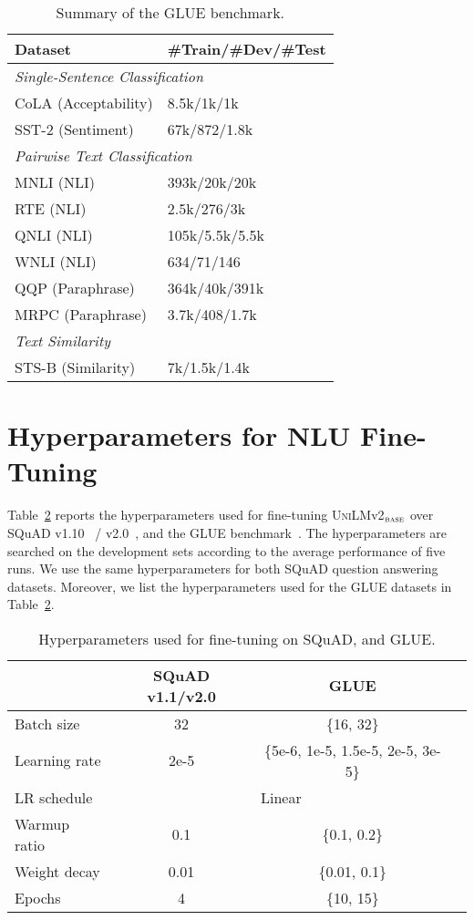 \documentclass{article}
\newcommand{\vtwobase}{\textsc{UniLM}v2$_{\textsc{base}}$}
\begin{document}
\begin{table}[h]
\centering
\begin{tabular}{l l}
\toprule 
\textbf{Dataset} & \textbf{\#Train/\#Dev/\#Test}   \\ \midrule
\multicolumn{2}{l}{\emph{Single-Sentence Classification}} \\
CoLA (Acceptability)&8.5k/1k/1k \\
SST-2 (Sentiment)&67k/872/1.8k \\ \midrule
\multicolumn{2}{l}{\emph{Pairwise Text Classification}} \\
MNLI (NLI)& 393k/20k/20k\\
RTE (NLI) &2.5k/276/3k \\ 
QNLI (NLI)& 105k/5.5k/5.5k\\
WNLI (NLI) &634/71/146\\ 
QQP (Paraphrase)&364k/40k/391k\\ 
MRPC (Paraphrase) &3.7k/408/1.7k\\ \midrule
\multicolumn{2}{l}{\emph{Text Similarity}} \\
STS-B (Similarity) &7k/1.5k/1.4k \\ \bottomrule
\end{tabular}
\caption{Summary of the GLUE benchmark.
}
\label{tbl:glue:datasets}
\end{table}


\section{Hyperparameters for NLU Fine-Tuning}

Table~\ref{tbl:nlu_finetune_hyperparams} reports the hyperparameters used for fine-tuning \vtwobase{} over SQuAD v1.10~\cite{squad1} / v2.0~\cite{squad2}, and the GLUE benchmark~\cite{wang2018glue}.
The hyperparameters are searched on the development sets according to the average performance of five runs.
We use the same hyperparameters for both SQuAD question answering datasets.
Moreover, we list the hyperparameters used for the GLUE datasets in Table~\ref{tbl:nlu_finetune_hyperparams}.


\begin{table}[h]
\centering
\small
\begin{tabular}{@{\hskip3pt}l@{\hskip2pt}c@{\hskip2pt}c@{\hskip2pt}c@{\hskip4pt}}
\toprule
 & \bf SQuAD v1.1/v2.0 & \bf GLUE \\
\midrule
Batch size & 32  & \{16, 32\}\\
Learning rate & 2e-5 & \{5e-6, 1e-5, 1.5e-5, 2e-5, 3e-5\}\\
LR schedule & \multicolumn{2}{c}{Linear} \\
Warmup ratio & 0.1 & \{0.1, 0.2\} \\
Weight decay & 0.01 & \{0.01, 0.1\} \\
Epochs & 4 & \{10, 15\} \\
\bottomrule
\end{tabular}
\caption{
Hyperparameters used for fine-tuning on SQuAD, and GLUE.
}
\label{tbl:nlu_finetune_hyperparams}
\end{table}
\end{document}
